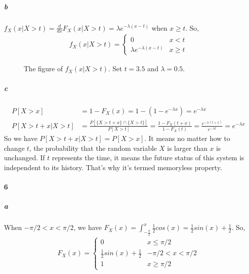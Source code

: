 \documentclass[22pt]{article}
\begin{document}
			\subparagraph{b} $f_X(x|X>t) = \frac{d}{dx}F_X(x|X>t) = \lambda e^{-\lambda(x-t)}$ when $x \geq t$.
			So,
			\begin{align}
				f_X(x|X>t) = 
				\begin{cases}
				0 & x< t\\
				\lambda e^{-\lambda(x-t)} & x\geq t
				\end{cases}
			\end{align}
			\begin{figure}[H]
				\centering
				\caption{The figure of $f_X(x|X>t)$. Set $t = 3.5$ and $\lambda = 0.5$. } 
				\label{5b}
			\end{figure}
		\subparagraph{c}
		\begin{align}
		P[X>x]  & = 1 - F_X(x) = 1 - (1 - e^{-\lambda x}) = e^{-\lambda x} \\
		P[X>t+x|X>t] & = \frac{P[\{X>t+x\}\cap \{X>t\}]}{P[X>t]} = \frac{1-F_X(t+x)}{1-F_X(t)} = \frac{e^{-\lambda(t+x)}}{e^{-\lambda t}} = e^{-\lambda x}
		\end{align}
		So we have $P[X>t+x|X>t]=P[X>x]$. It means no matter how to change $t$, the probability that the random variable $X$ is larger than $x$ is unchanged. If $t$ represents the time, it means the future status of this system is independent to its history. That's why it's termed memoryless property.

		\paragraph{6}
				\subparagraph{a}
				When $-\pi/2<x<\pi/2$, we have $F_X(x) = \int_{-\frac{\pi}{2}}^{x} \frac{1}{2}cos(x) = \frac{1}{2}sin(x) + \frac{1}{2}$. So,
				\begin{align}
				F_X(x) = 
				\begin{cases}
				0 & x\leq \pi	/2\\
				\frac{1}{2}sin(x) + \frac{1}{2} & -\pi	/2<x<\pi	/2\\
				1 & x\geq \pi	/2
				\end{cases}
			\end{align}
\end{document}
